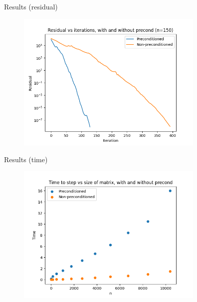 \documentclass[11pt,aspectratio=1610]{beamer}
\begin{document}
\begin{frame}{Results (residual)}
\begin{figure}
	\includegraphics[width=0.8\textwidth]{../images/residual_test.png}
\end{figure}
\end{frame}

\begin{frame}{Results (time)}
\begin{figure}
	\includegraphics[width=0.8\textwidth]{../images/time_test.png}
\end{figure}
\end{frame}



\end{document}
